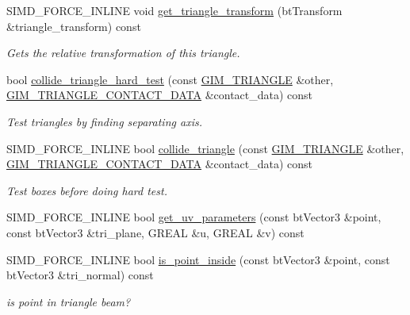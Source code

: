 \begin{DoxyCompactItemize}
\item 
S\+I\+M\+D\+\_\+\+F\+O\+R\+C\+E\+\_\+\+I\+N\+L\+I\+NE void \hyperlink{classGIM__TRIANGLE_a45e2c6e131c368afa12e210cf9166fbb}{get\+\_\+triangle\+\_\+transform} (bt\+Transform \&triangle\+\_\+transform) const
\begin{DoxyCompactList}\small\item\em Gets the relative transformation of this triangle. \end{DoxyCompactList}\item 
bool \hyperlink{classGIM__TRIANGLE_a60a6a90dccfd5f81663088847fbfae34}{collide\+\_\+triangle\+\_\+hard\+\_\+test} (const \hyperlink{classGIM__TRIANGLE}{G\+I\+M\+\_\+\+T\+R\+I\+A\+N\+G\+LE} \&other, \hyperlink{structGIM__TRIANGLE__CONTACT__DATA}{G\+I\+M\+\_\+\+T\+R\+I\+A\+N\+G\+L\+E\+\_\+\+C\+O\+N\+T\+A\+C\+T\+\_\+\+D\+A\+TA} \&contact\+\_\+data) const
\begin{DoxyCompactList}\small\item\em Test triangles by finding separating axis. \end{DoxyCompactList}\item 
S\+I\+M\+D\+\_\+\+F\+O\+R\+C\+E\+\_\+\+I\+N\+L\+I\+NE bool \hyperlink{classGIM__TRIANGLE_ac8930de461fb35af599d7a28d0a02229}{collide\+\_\+triangle} (const \hyperlink{classGIM__TRIANGLE}{G\+I\+M\+\_\+\+T\+R\+I\+A\+N\+G\+LE} \&other, \hyperlink{structGIM__TRIANGLE__CONTACT__DATA}{G\+I\+M\+\_\+\+T\+R\+I\+A\+N\+G\+L\+E\+\_\+\+C\+O\+N\+T\+A\+C\+T\+\_\+\+D\+A\+TA} \&contact\+\_\+data) const
\begin{DoxyCompactList}\small\item\em Test boxes before doing hard test. \end{DoxyCompactList}\item 
S\+I\+M\+D\+\_\+\+F\+O\+R\+C\+E\+\_\+\+I\+N\+L\+I\+NE bool \hyperlink{classGIM__TRIANGLE_aa35a00f5c7b9eeb8f0656be929294504}{get\+\_\+uv\+\_\+parameters} (const bt\+Vector3 \&point, const bt\+Vector3 \&tri\+\_\+plane, G\+R\+E\+AL \&u, G\+R\+E\+AL \&v) const
\item 
S\+I\+M\+D\+\_\+\+F\+O\+R\+C\+E\+\_\+\+I\+N\+L\+I\+NE bool \hyperlink{classGIM__TRIANGLE_ac465430340164aa45925762d3471b5f8}{is\+\_\+point\+\_\+inside} (const bt\+Vector3 \&point, const bt\+Vector3 \&tri\+\_\+normal) const
\begin{DoxyCompactList}\small\item\em is point in triangle beam? \end{DoxyCompactList}\item 
\mbox{\label{classGIM__TRIANGLE_a2942ca686a994c2d112ad356c2a4e7ad}} 

\end{DoxyCompactItemize}
